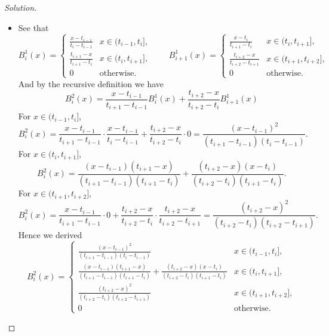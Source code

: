 \documentclass[a4paper]{ctexart}
\begin{document}
\begin{proof}[Solution]
	\begin{itemize}
		\item See that
		      $$
			      B_i^1(x)=\left\{ \begin{array}{ll}
				      \frac{x-t_{i-1}}{t_i-t_{i-1}} & x\in(t_{i-1},t_i], \\
				      \frac{t_{i+1}-x}{t_{i+1}-t_i} & x\in(t_i,t_{i+1}], \\
				      0                             & \text{otherwise}.
			      \end{array} \right. \qquad
			      B_{i+1}^1(x)=\left\{ \begin{array}{ll}
				      \frac{x-t_{i}}{t_{i+1}-t_{i}}     & x\in(t_{i},t_{i+1}],   \\
				      \frac{t_{i+2}-x}{t_{i+2}-t_{i+1}} & x\in(t_{i+1},t_{i+2}], \\
				      0                                 & \text{otherwise}.
			      \end{array} \right.
		      $$
		      And by the recursive definition we have
		      $$
			      B_i^2(x)=\frac{x-t_{i-1}}{t_{i+1}-t_{i-1}}B_i^1(x)+\frac{t_{i+2}-x}{t_{i+2}-t_{i}}B_{i+1}^1(x)
		      $$
		      For $x\in(t_{i-1},t_i]$,
		      $$
			      B_i^2(x)=\frac{x-t_{i-1}}{t_{i+1}-t_{i-1}}\cdot \frac{x-t_{i-1}}{t_i-t_{i-1}}+\frac{t_{i+2}-x}{t_{i+2}-t_{i}}\cdot 0 = \frac{(x-t_{i-1})^2}{(t_{i+1}-t_{i-1})(t_i-t_{i-1})}.
		      $$
		      For $x\in(t_{i},t_{i+1}]$,
		      $$
			      B_i^2(x)=\frac{(x-t_{i-1})(t_{i+1}-x)}{(t_{i+1}-t_{i-1})(t_{i+1}-t_i)}+\frac{(t_{i+2}-x)(x-t_i)}{(t_{i+2}-t_{i})(t_{i+1}-t_{i})}.
		      $$
		      For $x\in(t_{i+1},t_{i+2}]$,
		      $$
			      B_i^2(x)=\frac{x-t_{i-1}}{t_{i+1}-t_{i-1}}\cdot 0+\frac{t_{i+2}-x}{t_{i+2}-t_{i}}\cdot \frac{t_{i+2}-x}{t_{i+2}-t_{i+1}} = \frac{(t_{i+2}-x)^2}{(t_{i+2}-t_{i})(t_{i+2}-t_{i+1})}.
		      $$
		      Hence we derived
		      \begin{equation}
			      B_i^2(x)=\left\{ \begin{array}{ll}
				      \frac{(x-t_{i-1})^2}{(t_{i+1}-t_{i-1})(t_i-t_{i-1})}                                                                    & x\in(t_{i-1},t_i],     \\
				      \frac{(x-t_{i-1})(t_{i+1}-x)}{(t_{i+1}-t_{i-1})(t_{i+1}-t_i)}+\frac{(t_{i+2}-x)(x-t_i)}{(t_{i+2}-t_{i})(t_{i+1}-t_{i})} & x\in(t_i,t_{i+1}],     \\
				      \frac{(t_{i+2}-x)^2}{(t_{i+2}-t_{i})(t_{i+2}-t_{i+1})}                                                                  & x\in(t_{i+1},t_{i+2}], \\
				      0                                                                                                                       & \text{otherwise}.
			      \end{array} \right.
		      \end{equation}


\end{itemize}
\end{proof}
\end{document}

